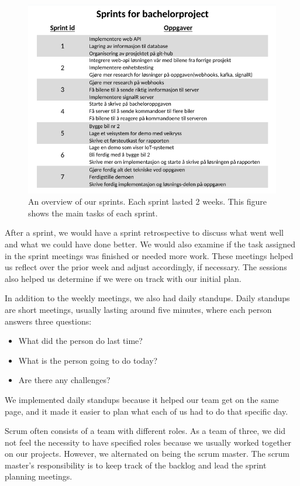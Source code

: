 \begin{figure}[h!]
	\centering
	\includegraphics[width=1\linewidth]{figures/Sprint_overview}
	\caption[Sprint overview]{An overview of our sprints. Each sprint lasted 2 weeks. This figure shows the main tasks of each sprint.}
	\label{fig:sprintoverview}
\end{figure}

After a sprint, we would have a sprint retrospective to discuss what went well and what we could have done better. We would also examine if the task assigned in the sprint meetings was finished or needed more work. These meetings helped us reflect over the prior week and adjust accordingly, if necessary. The sessions also helped us determine if we were on track with our initial plan. 
 
In addition to the weekly meetings, we also had daily standups. Daily standups are short meetings, usually lasting around five minutes, where each person answers three questions:
\begin{itemize}
	\item What did the person do last time? 
	\item What is the person going to do today? 
	\item Are there any challenges?
\end{itemize}
We implemented daily standups because it helped our team get on the same page, and it made it easier to plan what each of us had to do that specific day.

Scrum often consists of a team with different roles. As a team of three, we did not feel the necessity to have specified roles because we usually worked together on our projects. However, we alternated on being the scrum master. The scrum master's responsibility is to keep track of the backlog and lead the sprint planning meetings.

